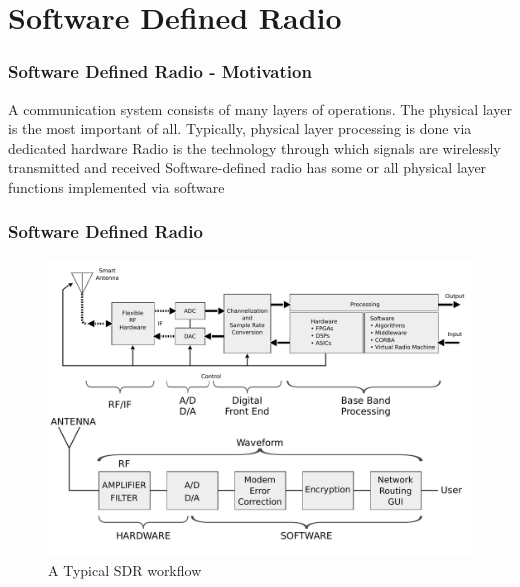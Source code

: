 \documentclass[10pt]{beamer}
\begin{document}
\section{Software Defined Radio}

\begin{frame}
    \frametitle{Software Defined Radio - Motivation}
    \begin{outline}
    \1 A communication system consists of many layers of operations.
    \1 The physical layer is the most important of all.
    \1 Typically, physical layer processing is done via dedicated hardware
    \1 Radio is the technology through which signals are wirelessly transmitted and received
    \1 Software-defined radio has some or all physical layer functions implemented via software
\end{outline}
\end{frame}

\begin{frame}
    \frametitle{Software Defined Radio}
\begin{figure}[h!]
    \centering
    \includegraphics[width=.8\textwidth]{SDR_et_WF.pdf}
    \caption{A Typical SDR workflow}
\end{figure}
\end{frame}
\end{document}
